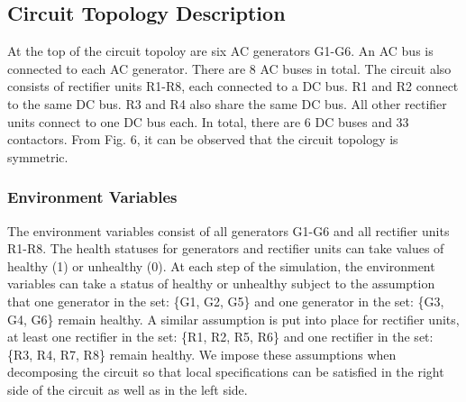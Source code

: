 \documentclass[journal]{IEEEtran}
\begin{document}
\subsection{Circuit Topology Description}
At the top of the circuit topoloy are six AC generators G1-G6. An AC bus is connected to each AC generator. There are 8 AC buses in total. The circuit also consists of rectifier units R1-R8, each connected to a DC bus. R1 and R2 connect to the same DC bus. R3 and R4 also share the same DC bus. All other rectifier units connect to one DC bus each. In total, there are 6 DC buses and 33 contactors. From Fig. 6, it can be observed that the circuit topology is symmetric. 
\subsubsection{Environment Variables}

The environment variables consist of all generators G1-G6 and all rectifier units R1-R8. The health statuses for generators and rectifier units can take values of healthy (1) or unhealthy (0). At each step of the simulation, the environment variables can take a status of healthy or unhealthy subject to the assumption that one generator in the set: \{G1, G2, G5\} and one generator in the set: \{G3, G4, G6\} remain healthy. A similar assumption is put into place for rectifier units, at least one rectifier in the set: \{R1, R2, R5, R6\} and one rectifier in the set: \{R3, R4, R7, R8\} remain healthy. We impose these assumptions when decomposing the circuit so that local specifications can be satisfied in the right side of the circuit as well as in the left side. 
\end{document}
